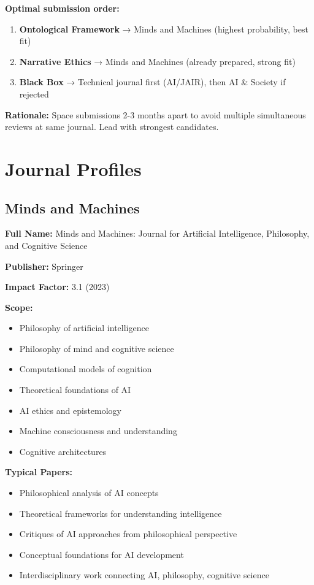 \documentclass[12pt]{article}
\begin{document}
\textbf{Optimal submission order:}
\begin{enumerate}
\item \textbf{Ontological Framework} → Minds and Machines (highest probability, best fit)
\item \textbf{Narrative Ethics} → Minds and Machines (already prepared, strong fit)
\item \textbf{Black Box} → Technical journal first (AI/JAIR), then AI \& Society if rejected
\end{enumerate}

\textbf{Rationale:} Space submissions 2-3 months apart to avoid multiple simultaneous reviews at same journal. Lead with strongest candidates.

\section{Journal Profiles}

\subsection{Minds and Machines}

\textbf{Full Name:} Minds and Machines: Journal for Artificial Intelligence, Philosophy, and Cognitive Science

\textbf{Publisher:} Springer

\textbf{Impact Factor:} 3.1 (2023)

\textbf{Scope:}
\begin{itemize}[leftmargin=*]
\item Philosophy of artificial intelligence
\item Philosophy of mind and cognitive science
\item Computational models of cognition
\item Theoretical foundations of AI
\item AI ethics and epistemology
\item Machine consciousness and understanding
\item Cognitive architectures
\end{itemize}

\textbf{Typical Papers:}
\begin{itemize}[leftmargin=*]
\item Philosophical analysis of AI concepts
\item Theoretical frameworks for understanding intelligence
\item Critiques of AI approaches from philosophical perspective
\item Conceptual foundations for AI development
\item Interdisciplinary work connecting AI, philosophy, cognitive science
\end{itemize}
\end{document}
